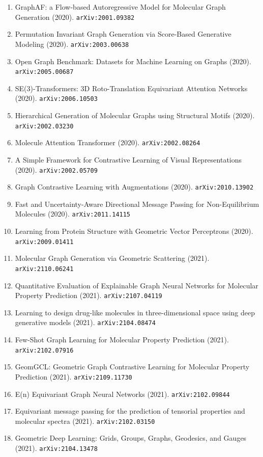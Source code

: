 \documentclass[11pt]{article}
\begin{document}
\begin{enumerate}
  \item GraphAF: a Flow-based Autoregressive Model for Molecular Graph
  Generation (2020). \texttt{arXiv:2001.09382}
  \item Permutation Invariant Graph Generation via Score-Based Generative
  Modeling (2020). \texttt{arXiv:2003.00638}
  \item Open Graph Benchmark: Datasets for Machine Learning on Graphs (2020). \texttt{arXiv:2005.00687}
  \item SE(3)-Transformers: 3D Roto-Translation Equivariant Attention Networks (2020). \texttt{arXiv:2006.10503}
  \item Hierarchical Generation of Molecular Graphs using Structural Motifs (2020). \texttt{arXiv:2002.03230}
  \item Molecule Attention Transformer (2020). \texttt{arXiv:2002.08264}
  \item A Simple Framework for Contrastive Learning of Visual Representations (2020). \texttt{arXiv:2002.05709}
  \item Graph Contrastive Learning with Augmentations (2020). \texttt{arXiv:2010.13902}
  \item Fast and Uncertainty-Aware Directional Message Passing for
  Non-Equilibrium Molecules (2020). \texttt{arXiv:2011.14115}
  \item Learning from Protein Structure with Geometric Vector Perceptrons (2020). \texttt{arXiv:2009.01411}
  \item Molecular Graph Generation via Geometric Scattering (2021). \texttt{arXiv:2110.06241}
  \item Quantitative Evaluation of Explainable Graph Neural Networks for
  Molecular Property Prediction (2021). \texttt{arXiv:2107.04119}
  \item Learning to design drug-like molecules in three-dimensional space using
  deep generative models (2021). \texttt{arXiv:2104.08474}
  \item Few-Shot Graph Learning for Molecular Property Prediction (2021). \texttt{arXiv:2102.07916}
  \item GeomGCL: Geometric Graph Contrastive Learning for Molecular Property
  Prediction (2021). \texttt{arXiv:2109.11730}
  \item E(n) Equivariant Graph Neural Networks (2021). \texttt{arXiv:2102.09844}
  \item Equivariant message passing for the prediction of tensorial properties
  and molecular spectra (2021). \texttt{arXiv:2102.03150}
  \item Geometric Deep Learning: Grids, Groups, Graphs, Geodesics, and Gauges (2021). \texttt{arXiv:2104.13478}

\end{enumerate}
\end{document}
